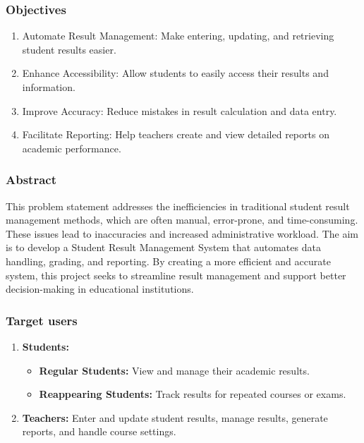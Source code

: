 \documentclass{beamer}
\begin{document}
\begin{frame}
    \frametitle{Objectives}
    \begin{enumerate}
        \item Automate Result Management: Make entering, updating, and retrieving student results easier.
        \item Enhance Accessibility: Allow students to easily access their results and information.
        \item Improve Accuracy: Reduce mistakes in result calculation and data entry.
        \item Facilitate Reporting: Help teachers create and view detailed reports on academic performance.
    \end{enumerate}
\end{frame}
\begin{frame}
    \frametitle{Abstract}
    
    This problem statement addresses the inefficiencies in traditional student result management methods, 
    which are often manual, error-prone, and time-consuming. These issues lead to inaccuracies and increased administrative workload. 
    The aim is to develop a Student Result Management System that automates data handling, grading, and reporting. 
    By creating a more efficient and accurate system, this project seeks to streamline result management and support better decision-making in educational institutions.
\end{frame}

\begin{frame}
    \frametitle{Target users}
    \begin{enumerate}
    \item \textbf{Students:}
        \begin{itemize}
            \item\textbf{Regular Students:} View and manage their academic results.
            \item\textbf{Reappearing Students:} Track results for repeated courses or exams.
        \end{itemize}
        \item\textbf{Teachers:} Enter and update student results, manage results, generate reports, and handle course settings.
    \end{enumerate}
\end{frame}
\end{document}
